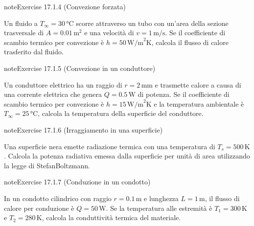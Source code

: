 \documentclass[letterpaper,10pt,italian]{jupyterBook}
\begin{document}
\begin{sphinxadmonition}{note}{Exercise 17.1.4 (Convezione forzata)}



\sphinxAtStartPar
Un fluido a \(T_\infty = 30 \, \text{°C}\) scorre attraverso un tubo con un’area della sezione trasversale di \(A = 0.01 \, \text{m}^2\) e una velocità di \(v = 1 \, \text{m/s}\). Se il coefficiente di scambio termico per convezione è \(h = 50 \, \text{W/m}^2\text{K}\), calcola il flusso di calore trasferito dal fluido.
\end{sphinxadmonition}
 \label{exercise:ch/thermodynamics/heat-transmission-problems-exercise-4}

\begin{sphinxadmonition}{note}{Exercise 17.1.5 (Convezione in un conduttore)}



\sphinxAtStartPar
Un conduttore elettrico ha un raggio di \(r = 2 \, \text{mm}\) e trasmette calore a causa di una corrente elettrica che genera \(Q = 0.5 \, \text{W}\) di potenza. Se il coefficiente di scambio termico per convezione è \(h = 15 \, \text{W/m}^2\text{K}\) e la temperatura ambientale è \(T_\infty = 25 \, \text{°C}\), calcola la temperatura della superficie del conduttore.
\end{sphinxadmonition}
 \label{exercise:ch/thermodynamics/heat-transmission-problems-exercise-5}

\begin{sphinxadmonition}{note}{Exercise 17.1.6 (Irraggiamento in una superficie)}



\sphinxAtStartPar
Una superficie nera emette radiazione termica con una temperatura di \(T_s = 500 \, \text{K}\). Calcola la potenza radiativa emessa dalla superficie per unità di area utilizzando la legge di Stefan\sphinxhyphen{}Boltzmann.
\end{sphinxadmonition}
 \label{exercise:ch/thermodynamics/heat-transmission-problems-exercise-6}

\begin{sphinxadmonition}{note}{Exercise 17.1.7 (Conduzione in un condotto)}



\sphinxAtStartPar
In un condotto cilindrico con raggio \(r = 0.1 \, \text{m}\) e lunghezza \(L = 1 \, \text{m}\), il flusso di calore per conduzione è \(Q = 50 \, \text{W}\). Se la temperatura alle estremità è \(T_1 = 300 \, \text{K}\) e \(T_2 = 280 \, \text{K}\), calcola la conduttività termica del materiale.
\end{sphinxadmonition}
 \label{exercise:ch/thermodynamics/heat-transmission-problems-exercise-7}
\end{document}
